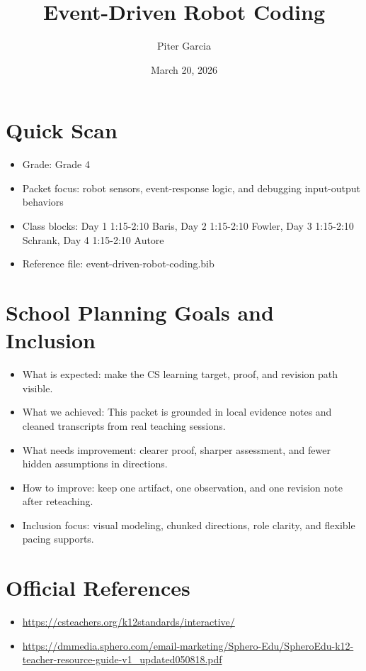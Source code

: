 \documentclass[11pt]{article}
\title{Event-Driven Robot Coding}
\author{Piter Garcia}
\date{March 20, 2026}
\begin{document}
\maketitle
\section*{Quick Scan}
\begin{itemize}[leftmargin=*]
\item Grade: Grade 4
\item Packet focus: robot sensors, event-response logic, and debugging input-output behaviors
\item Class blocks: Day 1 1:15-2:10 Baris, Day 2 1:15-2:10 Fowler, Day 3 1:15-2:10 Schrank, Day 4 1:15-2:10 Autore
\item Reference file: event-driven-robot-coding.bib
\end{itemize}
\section*{School Planning Goals and Inclusion}
\begin{itemize}[leftmargin=*]
\item What is expected: make the CS learning target, proof, and revision path visible.
\item What we achieved: This packet is grounded in local evidence notes and cleaned transcripts from real teaching sessions.
\item What needs improvement: clearer proof, sharper assessment, and fewer hidden assumptions in directions.
\item How to improve: keep one artifact, one observation, and one revision note after reteaching.
\item Inclusion focus: visual modeling, chunked directions, role clarity, and flexible pacing supports.
\end{itemize}
\section*{Official References}
\begin{itemize}[leftmargin=*]
\item \url{https://csteachers.org/k12standards/interactive/}
\item \url{https://dmmedia.sphero.com/email-marketing/Sphero-Edu/SpheroEdu-k12-teacher-resource-guide-v1_updated050818.pdf}
\end{itemize}
\end{document}
